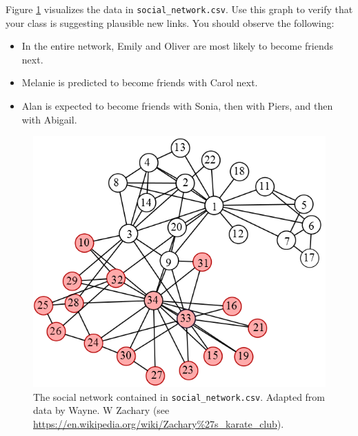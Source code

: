 \begin{problem}
Figure \ref{fig:social-network} visualizes the data in \texttt{social\_network.csv}.
Use this graph to verify that your class is suggesting plausible new links.
You should observe the following:
\begin{itemize}
\item In the entire network, Emily and Oliver are most likely to become friends next.
\item Melanie is predicted to become friends with Carol next.
\item Alan is expected to become friends with Sonia, then with Piers, and then with Abigail.
\end{itemize}
\end{problem}

\begin{figure}[H]
\includegraphics[width=.7\linewidth]{network.png}

\caption{The social network contained in \texttt{social\_network.csv}.
Adapted from data by Wayne. W Zachary (see \url{https://en.wikipedia.org/wiki/Zachary\%27s\_karate\_club}).}
\label{fig:social-network}


\end{figure}
